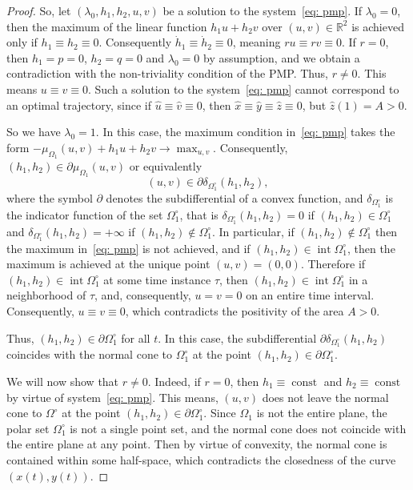 \documentclass[a4paper,12pt]{article}
\DeclareMathOperator{\const}{const}
\newcommand {\R}{{\mathbb R}}
\theoremstyle{remark}
\theoremstyle{definition}
\begin{document}
\begin{proof}
	So, let $(\lambda_0,h_1,h_2,u,v)$ be a solution to the system~\eqref{eq: pmp}. If $\lambda_0=0$, then the maximum of the linear function $h_1u+h_2v$ over $(u,v)\in\R^2$ is achieved only if $h_1\equiv h_2 \equiv 0$. Consequently $\dot h_1\equiv \dot h_2\equiv 0$, meaning $ru\equiv rv\equiv 0$. If $r=0$, then $h_1=p=0$, $h_2=q=0$ and $\lambda_0=0$ by assumption, and we obtain a contradiction with the non-triviality condition of the PMP. Thus, $r\ne 0$. This means $u\equiv v\equiv 0$. Such a solution to the system~\eqref{eq: pmp} cannot correspond to an optimal trajectory, since if $\hat u\equiv\hat v\equiv 0$, then $\hat x\equiv \hat y\equiv \hat z\equiv0$, but $\hat z(1)=A>0$.
	
	So we have $\lambda_0=1$. In this case, the maximum condition in~\eqref{eq: pmp} takes the form $-\mu_{\Omega_1}(u,v)+h_1u+h_2v\to\max_{u,v}$. Consequently, $(h_1,h_2)\in\partial\mu_{\Omega_1}(u,v)$ or equivalently
	\begin{equation}
		\label{eq: u v in subdifferential}
		(u,v)\in\partial \delta_{\Omega_1^\circ}(h_1,h_2),
	\end{equation}
	where the symbol $\partial$ denotes the subdifferential of a convex function, and $\delta_{\Omega_1^\circ}$ is the indicator function of the set $\Omega_1^\circ$, that is $\delta_{\Omega_1^\circ}(h_1,h_2)=0$ if $(h_1,h_2)\in\Omega_1^\circ$ and $\delta_{\Omega_1^\circ}(h_1,h_2)=+\infty$ if $(h_1,h_2)\not\in\Omega_1^\circ$. In particular, if $(h_1,h_2)\not\in\Omega_1^\circ$
    then the maximum in~\eqref{eq: pmp} is not achieved, and if $(h_1,h_2)\in\operatorname{int}\Omega_1^\circ$, then the maximum is achieved at the unique point $(u,v)=(0,0)$. Therefore if $(h_1,h_2)\in\operatorname{int}\Omega_1^\circ$ at some time instance $\tau$, then $(h_1,h_2)\in\operatorname{int}\Omega_1^\circ$ in a neighborhood of $\tau$, and, consequently, $u=v=0$ on an entire time interval. Consequently, $u\equiv v\equiv 0$, which contradicts the positivity of the area $A>0$.
	
	Thus, $(h_1,h_2)\in\partial\Omega_1^\circ$ for all $t$. In this case, the subdifferential $\partial\delta_{\Omega_1^\circ}(h_1,h_2)$ coincides with the normal cone to $\Omega_1^\circ$ at the point $(h_1,h_2)\in\partial\Omega_1^\circ$.
	
	We will now show that $r\ne 0$. Indeed, if $r=0$, then $h_1\equiv\const$ and $h_2\equiv\const$ by virtue of system~\eqref{eq: pmp}. This means, $(u,v)$ does not leave the normal cone to $\Omega^\circ$ at the point $(h_1,h_2)\in\partial\Omega_1^\circ$. Since $\Omega_1$ is not the entire plane, the polar set $\Omega_1^\circ$ is not a single point set, and the normal cone does not coincide with the entire plane at any point. Then by virtue of convexity, the normal cone is contained within some half-space, which contradicts the closedness of the curve $(x(t),y(t))$.
	

\end{proof}
\end{document}
